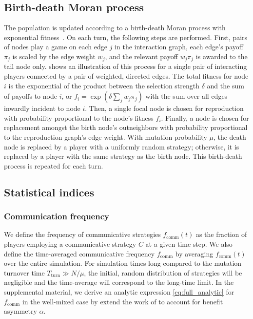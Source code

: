 \documentclass[pdflatex,twocolumn,sn-nature,super]{sn-jnl}
\begin{document}
\subsection{Birth-death Moran process}\label{sec:evo_setup}
The population is updated according to a birth-death Moran process
with exponential fitness~\citep{lieberman2005evolutionary}.
On each turn, the following steps are performed.
First, pairs of nodes play a game on each edge $j$ in the interaction graph,
each edge's payoff $\pi_j$ is scaled by the edge weight $w_j$,
and the relevant payoff $w_j \pi_j$ is awarded to the tail node only.
 shows an illustration of this process
for a single pair of interacting players connected by a pair of
weighted, directed edges.
The total fitness for node $i$ is the exponential of the product
between the selection strength $\delta$
and the sum of payoffs to node $i$,
or $f_i = \exp(\delta \sum_j w_j \pi_j)$ with the sum
over all edges inwardly incident to node $i$.
Then, a single focal node is chosen for reproduction
with probability proportional to the node's fitness $f_i$.
Finally, a node is chosen for replacement amongst the birth node's outneighbors
with probability proportional to the reproduction graph's edge weight.
With mutation probability $\mu$,
the death node is replaced by a player with a uniformly random strategy;
otherwise, it is replaced by a player with the same strategy as the birth node.
This birth-death process is repeated for each turn.

\subsection{Statistical indices}\label{sec:stats_setup}
\subsubsection{Communication frequency}
We define the frequency of communicative strategies
$f_{\text{comm}}(t)$ as the fraction of players employing
a communicative strategy $C$ at a given time step.
We also define the time-averaged communicative frequency
$f_{\text{comm}}$
by averaging $f_{\text{comm}}(t)$ over the entire simulation.
For simulation times long compared to the mutation turnover time
$T_{\text{turn}} \gg N/\mu$,
the initial, random distribution of strategies will be negligible
and the time-average will correspond to the long-time limit.
In the supplemental material,
we derive an analytic expression \cref{eq:full_analytic} for
$f_{\text{comm}}$ in the well-mixed case
by extend the work of \tripp{} to account for benefit asymmetry $\alpha$.
\end{document}
